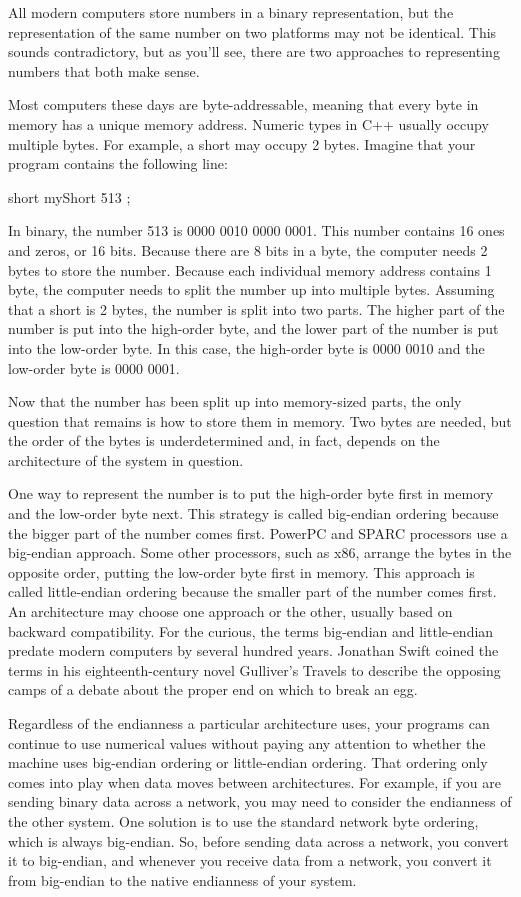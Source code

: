 All modern computers store numbers in a binary representation, but the representation of the same number on two platforms may not be identical. This sounds contradictory, but as you’ll see, there are two approaches to representing numbers that both make sense.

Most computers these days are byte-addressable, meaning that every byte in memory has a unique memory address. Numeric types in C++ usually occupy multiple bytes. For example, a short may occupy 2 bytes. Imagine that your program contains the following line:

\begin{cpp}
short myShort { 513 };
\end{cpp}

In binary, the number 513 is 0000 0010 0000 0001. This number contains 16 ones and zeros, or 16 bits. Because there are 8 bits in a byte, the computer needs 2 bytes to store the number. Because each individual memory address contains 1 byte, the computer needs to split the number up into multiple bytes. Assuming that a short is 2 bytes, the number is split into two parts. The higher part of the number is put into the high-order byte, and the lower part of the number is put into the low-order byte. In this case, the high-order byte is 0000 0010 and the low-order byte is 0000 0001.

Now that the number has been split up into memory-sized parts, the only question that remains is how to store them in memory. Two bytes are needed, but the order of the bytes is underdetermined and, in fact, depends on the architecture of the system in question.

One way to represent the number is to put the high-order byte first in memory and the low-order byte next. This strategy is called big-endian ordering because the bigger part of the number comes first. PowerPC and SPARC processors use a big-endian approach. Some other processors, such as x86, arrange the bytes in the opposite order, putting the low-order byte first in memory. This approach is called little-endian ordering because the smaller part of the number comes first. An architecture may choose one approach or the other, usually based on backward compatibility. For the curious, the terms big-endian and little-endian predate modern computers by several hundred years. Jonathan Swift coined the terms in his eighteenth-century novel Gulliver’s Travels to describe the opposing camps of a debate about the proper end on which to break an egg.

Regardless of the endianness a particular architecture uses, your programs can continue to use numerical values without paying any attention to whether the machine uses big-endian ordering or little-endian ordering. That ordering only comes into play when data moves between architectures. For example, if you are sending binary data across a network, you may need to consider the endianness of the other system. One solution is to use the standard network byte ordering, which is always big-endian. So, before sending data across a network, you convert it to big-endian, and whenever you receive data from a network, you convert it from big-endian to the native endianness of your system.

